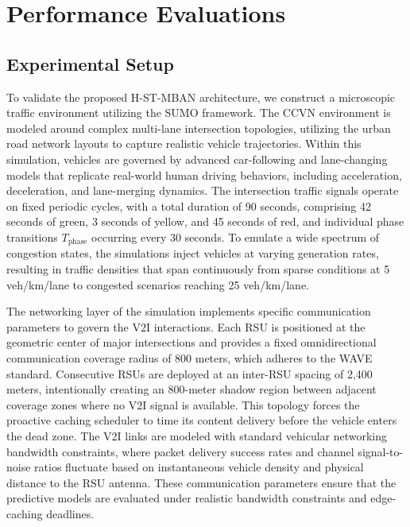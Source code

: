 \documentclass[journal]{IEEEtran}
\begin{document}
\section{Performance Evaluations} \label{sec:experiments}

\subsection{Experimental Setup}
To validate the proposed H-ST-MBAN architecture, we construct a microscopic traffic environment utilizing the SUMO framework. The CCVN environment is modeled around complex multi-lane intersection topologies, utilizing the urban road network layouts to capture realistic vehicle trajectories. Within this simulation, vehicles are governed by advanced car-following and lane-changing models that replicate real-world human driving behaviors, including acceleration, deceleration, and lane-merging dynamics. The intersection traffic signals operate on fixed periodic cycles, with a total duration of 90 seconds, comprising 42 seconds of green, 3 seconds of yellow, and 45 seconds of red, and individual phase transitions $T_\text{phase}$ occurring every 30 seconds. To emulate a wide spectrum of congestion states, the simulations inject vehicles at varying generation rates, resulting in traffic densities that span continuously from sparse conditions at 5 veh/km/lane to congested scenarios reaching 25 veh/km/lane.

The networking layer of the simulation implements specific communication parameters to govern the V2I interactions. Each RSU is positioned at the geometric center of major intersections and provides a fixed omnidirectional communication coverage radius of 800 meters, which adheres to the WAVE standard. Consecutive RSUs are deployed at an inter-RSU spacing of 2,400 meters, intentionally creating an 800-meter shadow region between adjacent coverage zones where no V2I signal is available. This topology forces the proactive caching scheduler to time its content delivery before the vehicle enters the dead zone. The V2I links are modeled with standard vehicular networking bandwidth constraints, where packet delivery success rates and channel signal-to-noise ratios fluctuate based on instantaneous vehicle density and physical distance to the RSU antenna. These communication parameters ensure that the predictive models are evaluated under realistic bandwidth constraints and edge-caching deadlines.
\end{document}
